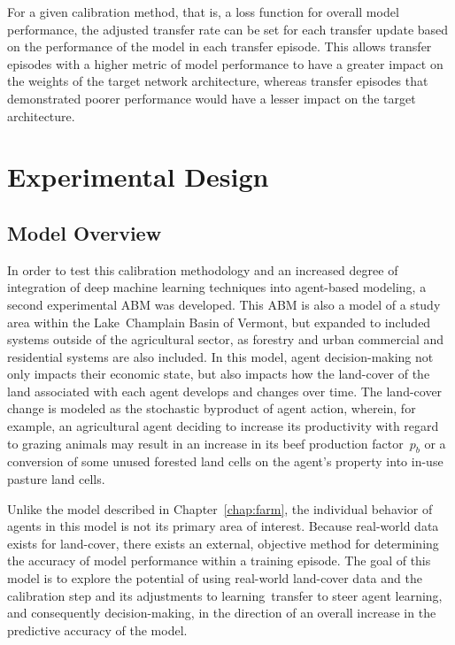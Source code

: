 For a given calibration method, that is, a loss function
for overall model performance, the adjusted transfer rate
can be set for each transfer update based on the performance
of the model in each transfer episode.
This allows transfer episodes with a higher metric of model
performance to have a greater impact on the weights of the
target network architecture, whereas transfer episodes that
demonstrated poorer performance would have a lesser impact
on the target architecture.

\section{Experimental Design}
\label{sec:land_exp}

\subsection{Model Overview}

In order to test this calibration methodology and an
increased degree of integration of deep machine learning
techniques into agent-based modeling, a second experimental
ABM was developed.
This ABM is also a model of a study area within the Lake~Champlain
Basin of Vermont, but expanded to included systems outside
of the agricultural sector, as forestry and urban commercial
and residential systems are also included.
In this model, agent decision-making not only impacts their
economic state, but also impacts how the land-cover of the
land associated with each agent develops and changes over time.
The land-cover change is modeled as the stochastic byproduct
of agent action, wherein, for example, an agricultural agent
deciding to increase its productivity with regard to grazing
animals may result in an increase in its beef 
production factor~$p_b$ or a conversion of some unused forested 
land cells on the agent's property into in-use pasture land
cells.

Unlike the model described in Chapter~\ref{chap:farm},
the individual behavior of agents in this model is not its
primary area of interest.
Because real-world data exists for land-cover,
there exists an external, objective method for determining
the accuracy of model performance within a training episode.
The goal of this model is to explore the potential of using
real-world land-cover data and the calibration step 
and its adjustments to learning~transfer to steer agent learning, 
and consequently decision-making, in the direction of an overall 
increase in the predictive accuracy of the model.



